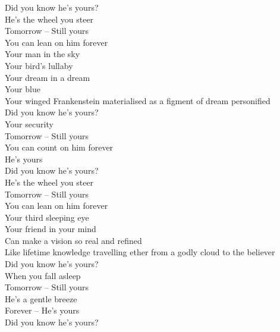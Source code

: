 \label{album:butterfly-3000}




Did you know he's yours? \\
He's the wheel you steer \\
Tomorrow -- Still yours \\
You can lean on him forever \\

Your man in the sky \\
Your bird's lullaby \\
Your dream in a dream \\
Your blue  \\
Your winged Frankenstein materialised as a figment of dream personified \\

Did you know he's yours? \\
Your security \\
Tomorrow -- Still yours \\
You can count on him forever \\
He's yours \\

Did you know he's yours? \\
He's the wheel you steer \\
Tomorrow -- Still yours \\
You can lean on him forever \\

Your third sleeping eye \\
Your friend in your mind \\
Can make a vision so real and refined \\
Like lifetime knowledge travelling ether from a godly cloud to the believer \\

Did you know he's yours? \\
When you fall asleep \\
Tomorrow -- Still yours \\
He's a gentle breeze \\
Forever -- He's yours \\

Did you know he's yours? \\

